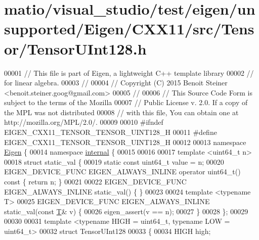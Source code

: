 \hypertarget{matio_2visual__studio_2test_2eigen_2unsupported_2_eigen_2_c_x_x11_2src_2_tensor_2_tensor_u_int128_8h_source}{}\section{matio/visual\+\_\+studio/test/eigen/unsupported/\+Eigen/\+C\+X\+X11/src/\+Tensor/\+Tensor\+U\+Int128.h}
\label{matio_2visual__studio_2test_2eigen_2unsupported_2_eigen_2_c_x_x11_2src_2_tensor_2_tensor_u_int128_8h_source}

\begin{DoxyCode}
00001 \textcolor{comment}{// This file is part of Eigen, a lightweight C++ template library}
00002 \textcolor{comment}{// for linear algebra.}
00003 \textcolor{comment}{//}
00004 \textcolor{comment}{// Copyright (C) 2015 Benoit Steiner <benoit.steiner.goog@gmail.com>}
00005 \textcolor{comment}{//}
00006 \textcolor{comment}{// This Source Code Form is subject to the terms of the Mozilla}
00007 \textcolor{comment}{// Public License v. 2.0. If a copy of the MPL was not distributed}
00008 \textcolor{comment}{// with this file, You can obtain one at http://mozilla.org/MPL/2.0/.}
00009 
00010 \textcolor{preprocessor}{#ifndef EIGEN\_CXX11\_TENSOR\_TENSOR\_UINT128\_H}
00011 \textcolor{preprocessor}{#define EIGEN\_CXX11\_TENSOR\_TENSOR\_UINT128\_H}
00012 
00013 \textcolor{keyword}{namespace }\hyperlink{namespace_eigen}{Eigen} \{
00014 \textcolor{keyword}{namespace }\hyperlink{namespaceinternal}{internal} \{
00015 
00016 
00017 \textcolor{keyword}{template} <u\textcolor{keywordtype}{int}64\_t n>
00018 \textcolor{keyword}{struct }static\_val \{
00019   \textcolor{keyword}{static} \textcolor{keyword}{const} uint64\_t value = n;
00020   EIGEN\_DEVICE\_FUNC EIGEN\_ALWAYS\_INLINE \textcolor{keyword}{operator} uint64\_t()\textcolor{keyword}{ const }\{ \textcolor{keywordflow}{return} n; \}
00021 
00022   EIGEN\_DEVICE\_FUNC EIGEN\_ALWAYS\_INLINE static\_val() \{ \}
00023 
00024   \textcolor{keyword}{template} <\textcolor{keyword}{typename} T>
00025   EIGEN\_DEVICE\_FUNC EIGEN\_ALWAYS\_INLINE static\_val(\textcolor{keyword}{const} \hyperlink{group___sparse_core___module_class_eigen_1_1_triplet}{T}& v) \{
00026     eigen\_assert(v == n);
00027   \}
00028 \};
00029 
00030 
00031 \textcolor{keyword}{template} <\textcolor{keyword}{typename} HIGH = u\textcolor{keywordtype}{int}64\_t, \textcolor{keyword}{typename} LOW = u\textcolor{keywordtype}{int}64\_t>
00032 \textcolor{keyword}{struct }TensorUInt128
00033 \{
00034   HIGH high;

\end{DoxyCode}
